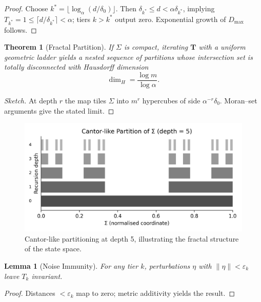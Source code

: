 \documentclass[11pt]{article}
\newtheorem{theorem}{Theorem}
\newtheorem{lemma}{Lemma}
\begin{document}
\begin{proof}
Choose
$k^\ast=\bigl\lfloor \log_\alpha (d/\delta_0)\bigr\rfloor$.
Then $\delta_{k^\ast}\le d<\alpha\delta_{k^\ast}$, implying
$T_{k^\ast}=1\le\lceil d/\delta_{k^\ast}\rceil<\alpha$; tiers
$k>k^\ast$ output zero.  Exponential growth of $D_{\max}$ follows.
\end{proof}

\begin{theorem}[Fractal Partition]
If $\Sigma$ is compact, iterating $\mathbf T$ with a uniform geometric
ladder yields a nested sequence of partitions whose intersection set
is totally disconnected with Hausdorff dimension
\[
\dim_H=\frac{\log m}{\log\alpha}.
\]
\end{theorem}

\begin{proof}[Sketch]
At depth $r$ the map tiles $\Sigma$ into $m^r$ hypercubes of side
$\alpha^{-r}\delta_0$.  Moran--set arguments give the stated limit.
\end{proof}

\begin{figure}[ht]
  \centering
  \includegraphics[width=0.9\linewidth]{figures/cantor_partition_depth5.png}
  \caption{Cantor-like partitioning at depth 5, illustrating the fractal structure of the state space.}
  \label{fig:cantor_partition}
\end{figure}

\begin{lemma}[Noise Immunity]
For any tier $k$, perturbations $\eta$ with
$\|\eta\|<\varepsilon_k$ leave $T_k$ invariant.
\end{lemma}

\begin{proof}
Distances $<\varepsilon_k$ map to zero; metric additivity yields the
result.
\end{proof}

\end{document}

